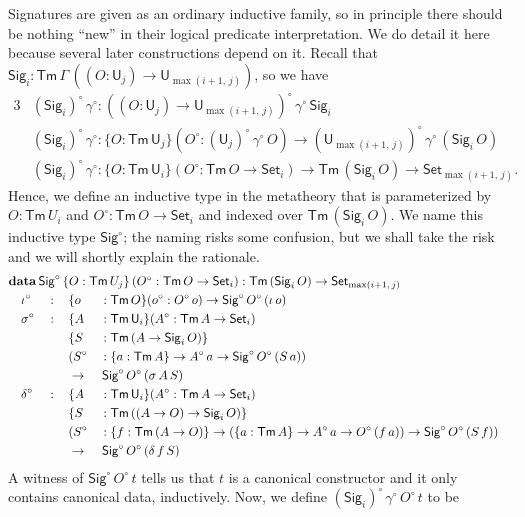 \documentclass[acmsmall,screen,review,anonymous]{acmart}
\newcommand{\msf}[1]{{\mathsf{#1}}}
\newcommand{\mbf}[1]{{\mathbf{#1}}}
\newcommand{\data}{\mbf{data}}
\newcommand{\U}{\msf{U}}
\newcommand{\Set}{\msf{Set}}
\newcommand{\Sig}{\msf{Sig}}
\newcommand{\Tm}{\msf{Tm}}
\newcommand{\w}{\circ}
\begin{document}
Signatures are given as an ordinary inductive family, so in principle there should be nothing
``new'' in their logical predicate interpretation. We do detail it here because several later
constructions depend on it. Recall that $\Sig_i : \Tm\,\Gamma\,((O : \U_j) \to \U_{\max(i+1,\,j)})$,
so we have
\begin{alignat*}{3}
  &(\Sig_i)^\w\,\gamma^\w : ((O : \U_j) \to \U_{\max(i+1,\,j)})^\w\,\gamma^\w\,\Sig_i\\
  &(\Sig_i)^\w\,\gamma^\w : \{O : \Tm\,\U_j\}(O^\w : (\U_j)^\w\,\gamma^\w\,O) \to (\U_{\max(i+1,\,j)})^\w\,\gamma^\w\,(\Sig_i\,O)\\
  &(\Sig_i)^\w\,\gamma^\w : \{O : \Tm\,\U_i\}(O^\w : \Tm\,O \to \Set_i) \to \Tm\,(\Sig_i\,O) \to \Set_{\max(i+1,\,j)}.
\end{alignat*}
Hence, we define an inductive type in the metatheory that is parameterized by $O : \Tm\,U_i$ and
$O^\w : \Tm\,O \to \Set_i$ and indexed over $\Tm\,(\Sig_i\,O)$. We name this inductive type
$\Sig^\w$; the naming risks some confusion, but we shall take the risk and we will shortly
explain the rationale.
\begin{alignat*}{4}
  &\rlap{$\data\,\Sig^\w\,\{O : \Tm\,U_j\}\,(O^\w : \Tm\,O \to \Set_i)  : \Tm\,(\Sig_i\,O) \to \Set_{\max(i+1,\,j)}$}\\
  &\quad \iota^\w  &&:\,&&\{o &&: \Tm\,O\}(o^\w : O^\w\,o) \to \Sig^\w\,O^\w\,(\iota\,o)\\
  &\quad \sigma^\w &&:\,&&\{A &&: \Tm\,\U_i\}(A^\w : \Tm\,A \to \Set_i)\\
  &               && &&\{S &&: \Tm\,(A \to \Sig_i\,O)\}\\
  &               && && (S^\w &&: \{a : \Tm\,A\} \to A^\w\,a \to \Sig^\w\,O^\w\,(S\,a))\\
  &               && && \to &&\,\Sig^\w\,O^\w\,(\sigma\,A\,S)\\
  &\quad \delta^\w &&:\,&&\{A &&: \Tm\,\U_i\}(A^\w : \Tm\,A \to \Set_i)\\
  &               &&   && \{S &&: \Tm\,((A \to O) \to \Sig_i\,O)\}\\
  &               &&   && (S^\w &&: \{f : \Tm\,(A \to O)\} \to (\{a : \Tm\,A\} \to A^\w\,a \to O^\w\,(f\,a)) \to \Sig^\w\,O^\w\,(S\,f))\\
  &\quad          &&   && \to &&\,\Sig^\w\,O^\w\,(\delta\,f\,S)
\end{alignat*}
A witness of $\Sig^\w\,O^\w\,t$ tells us that $t$ is a canonical constructor and it only contains
canonical data, inductively. Now, we define $(\Sig_i)^\w\,\gamma^\w\,O^\w\,t$ to be
\end{document}
